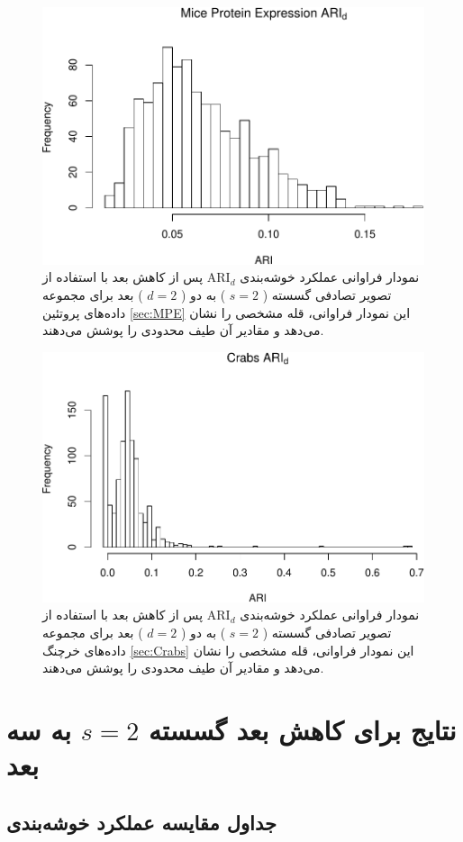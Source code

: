 \begin{figure}[H]
\centering
\includegraphics[width=0.7\linewidth]{Report_files/figure-latex/unnamed-chunk-15-6}
\caption{
نمودار فراوانی عملکرد خوشه‌بندی 
$\mathrm{ARI}_d$
پس از کاهش بعد با استفاده از تصویر تصادفی
گسسته (%
$s=2$%
)
به دو (%
$d=2$%
)
بعد برای مجموعه داده‌های
پروتئین
\ref{sec:MPE}
این نمودار فراوانی،
قله
مشخصی را نشان 
می‌دهد
و مقادیر آن طیف 
محدودی
 را پوشش می‌دهند.
}
\end{figure}

\begin{figure}[H]
\centering
\includegraphics[width=0.7\linewidth]{Report_files/figure-latex/unnamed-chunk-15-7}
\caption{
نمودار فراوانی عملکرد خوشه‌بندی 
$\mathrm{ARI}_d$
پس از کاهش بعد با استفاده از تصویر تصادفی
گسسته (%
$s=2$%
)
به دو (%
$d=2$%
)
بعد برای مجموعه داده‌های
خرچنگ
\ref{sec:Crabs}
این نمودار فراوانی،
قله
مشخصی را نشان 
می‌دهد
و مقادیر آن طیف 
محدودی
 را پوشش می‌دهند.
}
\end{figure}


\section{
نتایج برای کاهش بعد گسسته $s=2$ به سه بعد
}
\label{sec:S2D3}

\subsection{جداول مقایسه عملکرد خوشه‌بندی}

